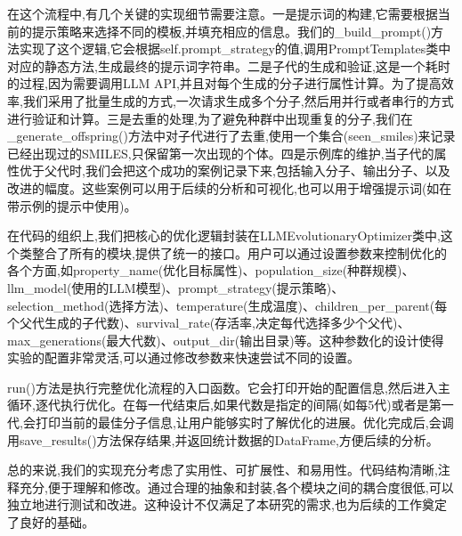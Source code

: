 在这个流程中,有几个关键的实现细节需要注意。一是提示词的构建,它需要根据当前的提示策略来选择不同的模板,并填充相应的信息。我们的\_build\_prompt()方法实现了这个逻辑,它会根据self.prompt\_strategy的值,调用PromptTemplates类中对应的静态方法,生成最终的提示词字符串。二是子代的生成和验证,这是一个耗时的过程,因为需要调用LLM API,并且对每个生成的分子进行属性计算。为了提高效率,我们采用了批量生成的方式,一次请求生成多个分子,然后用并行或者串行的方式进行验证和计算。三是去重的处理,为了避免种群中出现重复的分子,我们在\_generate\_offspring()方法中对子代进行了去重,使用一个集合(seen\_smiles)来记录已经出现过的SMILES,只保留第一次出现的个体。四是示例库的维护,当子代的属性优于父代时,我们会把这个成功的案例记录下来,包括输入分子、输出分子、以及改进的幅度。这些案例可以用于后续的分析和可视化,也可以用于增强提示词(如在带示例的提示中使用)。

在代码的组织上,我们把核心的优化逻辑封装在LLMEvolutionaryOptimizer类中,这个类整合了所有的模块,提供了统一的接口。用户可以通过设置参数来控制优化的各个方面,如property\_name(优化目标属性)、population\_size(种群规模)、llm\_model(使用的LLM模型)、prompt\_strategy(提示策略)、selection\_method(选择方法)、temperature(生成温度)、children\_per\_parent(每个父代生成的子代数)、survival\_rate(存活率,决定每代选择多少个父代)、max\_generations(最大代数)、output\_dir(输出目录)等。这种参数化的设计使得实验的配置非常灵活,可以通过修改参数来快速尝试不同的设置。

run()方法是执行完整优化流程的入口函数。它会打印开始的配置信息,然后进入主循环,逐代执行优化。在每一代结束后,如果代数是指定的间隔(如每5代)或者是第一代,会打印当前的最佳分子信息,让用户能够实时了解优化的进展。优化完成后,会调用save\_results()方法保存结果,并返回统计数据的DataFrame,方便后续的分析。

总的来说,我们的实现充分考虑了实用性、可扩展性、和易用性。代码结构清晰,注释充分,便于理解和修改。通过合理的抽象和封装,各个模块之间的耦合度很低,可以独立地进行测试和改进。这种设计不仅满足了本研究的需求,也为后续的工作奠定了良好的基础。
